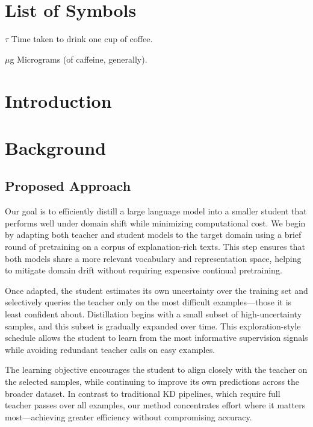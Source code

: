 \documentclass[draft]{uiucthesis2021}
\begin{document}
\chapter{List of Symbols}

\begin{symbollist}[0.7in]
\item[$\tau$] Time taken to drink one cup of coffee.
\item[$\mu$g] Micrograms (of caffeine, generally).
\end{symbollist}

\mainmatter

\chapter{Introduction}


\chapter{Background}


\section{Proposed Approach}
Our goal is to efficiently distill a large language model into a smaller student that performs well under domain shift while minimizing computational cost. We begin by adapting both teacher and student models to the target domain using a brief round of pretraining on a corpus of explanation-rich texts. This step ensures that both models share a more relevant vocabulary and representation space, helping to mitigate domain drift without requiring expensive continual pretraining.

Once adapted, the student estimates its own uncertainty over the training set and selectively queries the teacher only on the most difficult examples—those it is least confident about. Distillation begins with a small subset of high-uncertainty samples, and this subset is gradually expanded over time. This exploration-style schedule allows the student to learn from the most informative supervision signals while avoiding redundant teacher calls on easy examples.

The learning objective encourages the student to align closely with the teacher on the selected samples, while continuing to improve its own predictions across the broader dataset. In contrast to traditional KD pipelines, which require full teacher passes over all examples, our method concentrates effort where it matters most—achieving greater efficiency without compromising accuracy.
\end{document}

